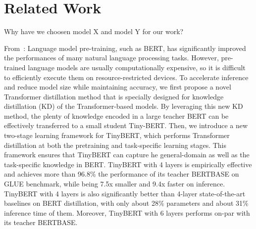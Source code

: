 \section{Related Work}

Why have we choosen model X and model Y for our work?

From~\cite{jiao20}: Language model pre-training, such as BERT, has significantly improved the performances of many natural language processing tasks. However, pre-trained language models are usually computationally expensive, so it is difficult to efficiently execute them on resource-restricted devices. To accelerate inference and reduce model size while maintaining accuracy, we first propose a novel Transformer distillation method that is specially designed for knowledge distillation (KD) of the Transformer-based models. By leveraging this new KD method, the plenty of knowledge encoded in a large teacher BERT can be effectively transferred to a small student Tiny-BERT. Then, we introduce a new two-stage learning framework for TinyBERT, which performs Transformer distillation at both the pretraining and task-specific learning stages. This framework ensures that TinyBERT can capture he general-domain as well as the task-specific knowledge in BERT.
TinyBERT with 4 layers is empirically effective and achieves more than 96.8\% the performance of its teacher BERTBASE on GLUE benchmark, while being 7.5x smaller and 9.4x faster on inference. TinyBERT with 4 layers is also significantly better than 4-layer state-of-the-art baselines on BERT distillation, with only about 28\% parameters and about 31\% inference time of them. Moreover, TinyBERT with 6 layers performs on-par with its teacher BERTBASE.


